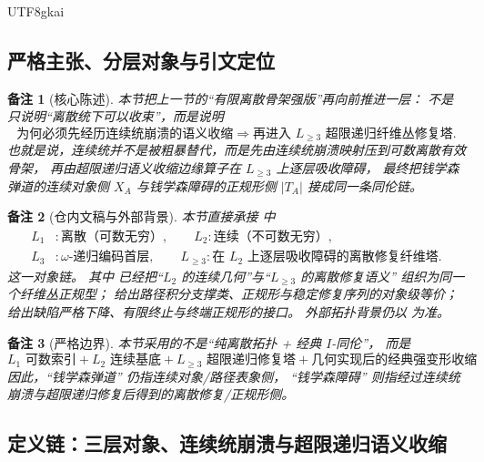 \documentclass[12pt]{article}
\newtheorem{remark}{备注}[section]
\begin{document}
\begin{CJK*}{UTF8}{gkai}
\subsection{严格主张、分层对象与引文定位}
\label{subsec:tex1-ch10-claim}

\begin{remark}[核心陈述]
本节把上一节的“有限离散骨架强版”再向前推进一层：
不是只说明“离散统下可以收束”，而是说明
\[
  \text{为何必须先经历连续统崩溃的语义收缩}
  \Longrightarrow
  \text{再进入 }L_{\ge 3}\text{ 超限递归纤维丛修复塔}.
\]
也就是说，连续统并不是被粗暴替代，而是先由连续统崩溃映射压到可数离散有效骨架，
再由超限递归语义收缩边缘算子在 \(L_{\ge 3}\) 上逐层吸收障碍，
最终把钱学森弹道的连续对象侧 \(X_A\) 与钱学森障碍的正规形侧 \(|T_A|\) 接成同一条同伦链。
\end{remark}

\begin{remark}[仓内文稿与外部背景]
本节直接承接 \cite{RepoTex41HomotopyRepairBundle} 中
\[
  \begin{aligned}
    L_1&:\text{离散（可数无穷）},\qquad
    L_2:\text{连续（不可数无穷）},\\
    L_3&:\omega\text{-递归编码首层},\qquad
    L_{\ge 3}:\text{在 }L_2\text{ 上逐层吸收障碍的离散修复纤维塔}.
  \end{aligned}
\]
这一对象链。
其中 \cite{RepoTex41HomotopyRepairBundle} 已经把“\(L_2\) 的连续几何”与“\(L_{\ge 3}\) 的离散修复语义”
组织为同一个纤维丛正规型；
\cite{RepoTex36HomotopyTwistEquivalence} 给出路径积分支撑类、正规形与稳定修复序列的对象级等价；
\cite{RepoTex38JacobiBianchiRepair} 给出缺陷严格下降、有限终止与终端正规形的接口。
外部拓扑背景仍以 \cite{Hatcher2002AT,Husemoller1994FibreBundles} 为准。
\end{remark}

\begin{remark}[严格边界]
本节采用的不是“纯离散拓扑 + 经典 \(I\)-同伦”，
而是
\[
  \boxed{
    L_1\text{ 可数索引}
    +L_2\text{ 连续基底}
    +L_{\ge 3}\text{ 超限递归修复塔}
    +\text{几何实现后的经典强变形收缩}
  }.
\]
因此，``钱学森弹道'' 仍指连续对象/路径表象侧，
``钱学森障碍'' 则指经过连续统崩溃与超限递归修复后得到的离散修复/正规形侧。
\end{remark}

\subsection{定义链：三层对象、连续统崩溃与超限递归语义收缩}
\label{subsec:tex1-ch10-defs}


\end{CJK*}
\end{document}
